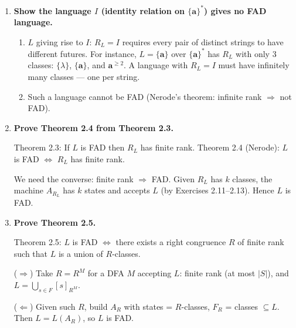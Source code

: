 \begin{enumerate}[{2.}1.]
($\Leftarrow$) If $R_L$ has finite rank $k$, construct the minimal machine $A_{R_L}=\langle\Sigma,[{\cdot}]_{R_L},[\lambda]_{R_L},\delta_{R_L},F_{R_L}\rangle$ with $k$ states (shown well-defined in Exercises 2.11--2.12). Show $L(A_{R_L})=L$: $x\in L(A_{R_L})\Leftrightarrow\DBAR_{R_L}([\lambda],x)\in F_{R_L}\Leftrightarrow[x]\in F_{R_L}\Leftrightarrow x\in L$.

\item \textbf{Show the language $I$ (identity relation on $\{\mathbf{a}\}^*$) gives no FAD language.}

\begin{enumerate}
\item $L$ giving rise to $I$: $R_L=I$ requires every pair of distinct strings to have different futures. For instance, $L=\{\mathbf{a}\}$ over $\{\mathbf{a}\}^*$ has $R_L$ with only 3 classes: $\{\lambda\}$, $\{\mathbf{a}\}$, and $\mathbf{a}^{\geq 2}$. A language with $R_L=I$ must have infinitely many classes — one per string.

\item Such a language cannot be FAD (Nerode's theorem: infinite rank $\Rightarrow$ not FAD).
\end{enumerate}

\item \textbf{Prove Theorem 2.4 from Theorem 2.3.}

Theorem 2.3: If $L$ is FAD then $R_L$ has finite rank. Theorem 2.4 (Nerode): $L$ is FAD $\Leftrightarrow$ $R_L$ has finite rank.

We need the converse: finite rank $\Rightarrow$ FAD. Given $R_L$ has $k$ classes, the machine $A_{R_L}$ has $k$ states and accepts $L$ (by Exercises 2.11--2.13). Hence $L$ is FAD.

\item \textbf{Prove Theorem 2.5.}

Theorem 2.5: $L$ is FAD $\Leftrightarrow$ there exists a right congruence $R$ of finite rank such that $L$ is a union of $R$-classes.

($\Rightarrow$) Take $R=R^M$ for a DFA $M$ accepting $L$: finite rank (at most $|S|$), and $L=\bigcup_{s\in F}[s]_{R^M}$.

($\Leftarrow$) Given such $R$, build $A_R$ with states = $R$-classes, $F_R$ = classes $\subseteq L$. Then $L=L(A_R)$, so $L$ is FAD.


\end{enumerate}
